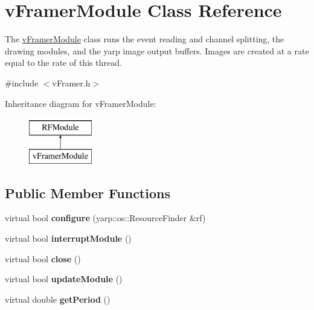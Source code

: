 \hypertarget{classvFramerModule}{}\section{v\+Framer\+Module Class Reference}
\label{classvFramerModule}


The \hyperlink{classvFramerModule}{v\+Framer\+Module} class runs the event reading and channel splitting, the drawing modules, and the yarp image output buffers. Images are created at a rate equal to the rate of this thread.  




{\ttfamily \#include $<$v\+Framer.\+h$>$}

Inheritance diagram for v\+Framer\+Module\+:\begin{figure}[H]
\begin{center}
\leavevmode
\includegraphics[height=2.000000cm]{classvFramerModule}
\end{center}
\end{figure}
\subsection*{Public Member Functions}
\begin{DoxyCompactItemize}
\item 
virtual bool {\bfseries configure} (yarp\+::os\+::\+Resource\+Finder \&rf)\hypertarget{classvFramerModule_a68f4d912eec9fb85e56c7d1b17cb678b}{}\label{classvFramerModule_a68f4d912eec9fb85e56c7d1b17cb678b}

\item 
virtual bool {\bfseries interrupt\+Module} ()\hypertarget{classvFramerModule_a0e346732e0e922007a27cffbc337c595}{}\label{classvFramerModule_a0e346732e0e922007a27cffbc337c595}

\item 
virtual bool {\bfseries close} ()\hypertarget{classvFramerModule_a132ce95e54786b24864dbd58f660d957}{}\label{classvFramerModule_a132ce95e54786b24864dbd58f660d957}

\item 
virtual bool {\bfseries update\+Module} ()\hypertarget{classvFramerModule_a4169d6f2c241299a513cc87793e05be3}{}\label{classvFramerModule_a4169d6f2c241299a513cc87793e05be3}

\item 
virtual double {\bfseries get\+Period} ()\hypertarget{classvFramerModule_a99439fb2c0b0c06b8dd0e31261ede4ab}{}\label{classvFramerModule_a99439fb2c0b0c06b8dd0e31261ede4ab}

\end{DoxyCompactItemize}


